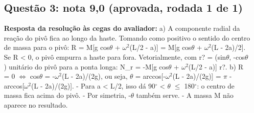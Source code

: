 \documentclass{article}%
\begin{document}
\subsection*{Questão 3: nota 9,0 (aprovada, rodada 1 de 1)}%
\textbf{Resposta da resolução às cegas do avaliador:} a) A componente radial da reação do pivô fica ao longo da haste. Tomando como positivo o sentido do centro de massa para o pivô:\newline%
R = M{[}g cos$\theta$ + $\omega$$^2$(L/2 - a){]} = M{[}g cos$\theta$ + $\omega$$^2$(L - 2a)/2{]}.\newline%
Se R < 0, o pivô empurra a haste para fora. Vetorialmente, com r? = (sin$\theta$, -cos$\theta$) unitário do pivô para a ponta longa: N\_r = -M{[}g cos$\theta$ + $\omega$$^2$(L/2 - a){]} r?.\newline%
\newline%
b) R = 0 $\Leftrightarrow$ cos$\theta$ = -$\omega$$^2$(L - 2a)/(2g), ou seja, $\theta$ = arccos{[}-$\omega$$^2$(L - 2a)/(2g){]} = $\pi$ - arccos{[}$\omega$$^2$(L - 2a)/(2g){]}.\newline%
{-} Para a < L/2, isso dá 90$^\circ$ < $\theta$ $\leq$ 180$^\circ$: o centro de massa fica acima do pivô.\newline%
{-} Por simetria, -$\theta$ também serve.\newline%
{-} A massa M não aparece no resultado.\newline%
\end{document}
